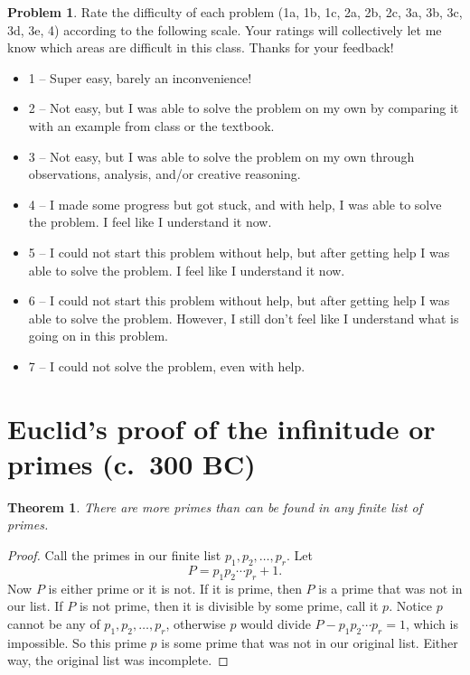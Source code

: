 \documentclass[11pt,oneside]{amsart}
\theoremstyle{definition}
\newtheorem{problem}{Problem}
\theoremstyle{plain}
\newtheorem{theorem}{Theorem}
\begin{document}
    \begin{problem}
        Rate the difficulty of each problem (1a, 1b, 1c, 2a, 2b, 2c, 3a, 3b, 3c, 3d, 3e, 4) according to the following scale. Your ratings will collectively let me know which areas are difficult in this class. Thanks for your feedback!
        \begin{itemize}
            \item 1 -- Super easy, barely an inconvenience!
            \item 2 -- Not easy, but I was able to solve the problem on my own by comparing it with an example from class or the textbook.
            \item 3 -- Not easy, but I was able to solve the problem on my own through observations, analysis, and/or creative reasoning.
            \item 4 -- I made some progress but got stuck, and with help, I was able to solve the problem. I feel like I understand it now.
            \item 5 -- I could not start this problem without help, but after getting help I was able to solve the problem. I feel like I understand it now.
            \item 6 -- I could not start this problem without help, but after getting help I was able to solve the problem. However, I still don't feel like I understand what is going on in this problem.
            \item 7 -- I could not solve the problem, even with help.
        \end{itemize}
    \end{problem}

    \newpage

    \section{Euclid's proof of the infinitude or primes (c.\ 300 BC)}
    \begin{theorem}
        There are more primes than can be found in any finite list of primes.
    \end{theorem}
    \begin{proof}
        Call the primes in our finite list $p_1,p_2,\dots,p_r$.  Let
        \[P=p_1p_2\cdots p_r+1.\]
        Now $P$ is either prime or it is not. If it is prime, then $P$ is a prime that was not in our list.  If $P$ is not prime, then it is divisible by some prime, call it $p$.  Notice $p$ cannot be any of $p_1,p_2,\dots,p_r$, otherwise $p$ would divide $P-p_1p_2\cdots p_r=1$, which is impossible.  So this prime $p$ is some prime that was not in our original list.  Either way, the original list was incomplete.
    \end{proof}
\end{document}
